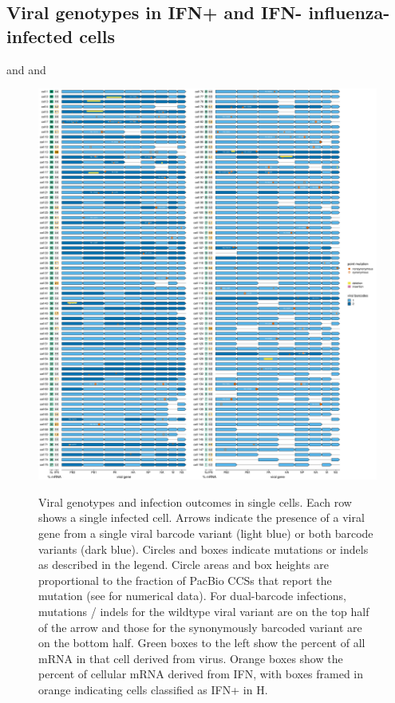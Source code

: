 \documentclass[9pt,lineno]{elife}
\begin{document}
\subsection{Viral genotypes in IFN+ and IFN- influenza-infected cells}
 and  and 


\begin{figure}
\begin{fullwidth}
{\centering
\includegraphics[height=0.76\textheight]{figures/single_cell_figures/p_genotypes.pdf}
}
\caption{
Viral genotypes and infection outcomes in single cells.
Each row shows a single infected cell.
Arrows indicate the presence of a viral gene from a single viral barcode variant (light blue) or both barcode variants (dark blue).
Circles and boxes indicate mutations or indels as described in the legend.
Circle areas and box heights are proportional to the fraction of PacBio CCSs that report the mutation (see  for numerical data).
For dual-barcode infections, mutations / indels for the wildtype viral variant are on the top half of the arrow and those for the synonymously barcoded variant are on the bottom half. 
Green boxes to the left show the percent of all mRNA in that cell derived from virus.
Orange boxes show the percent of cellular mRNA derived from IFN, with boxes framed in orange indicating cells classified as IFN+ in H.
}
\label{fig:genotypes}


\end{fullwidth}
\end{figure}
\end{document}
